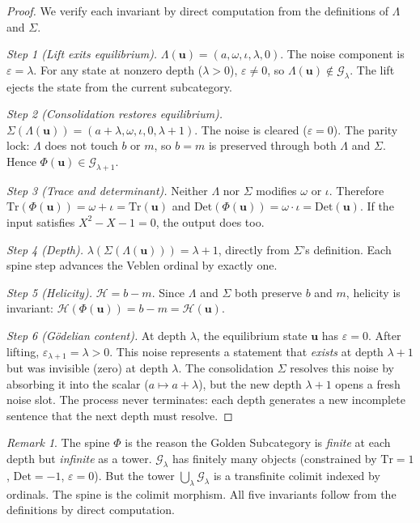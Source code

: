 \documentclass[12pt,oneside]{article}
\theoremstyle{principia}
\theoremstyle{definition}
\theoremstyle{remark}
\newtheorem{remark}[theorem]{Remark}
\providecommand{\GG}{\mathcal{G}}
\providecommand{\eps}{\varepsilon}
\providecommand{\lam}{\lambda}
\begin{document}
\begin{proof}
We verify each invariant by direct computation from the definitions of $\Lambda$ and $\Sigma$.

\emph{Step 1 (Lift exits equilibrium).} $\Lambda(\mathbf{u}) = (a, \omega, \iota, \lam, 0)$. The noise component is $\eps = \lam$. For any state at nonzero depth ($\lam > 0$), $\eps \neq 0$, so $\Lambda(\mathbf{u}) \notin \GG_\lam$. The lift ejects the state from the current subcategory.

\emph{Step 2 (Consolidation restores equilibrium).} $\Sigma(\Lambda(\mathbf{u})) = (a + \lam, \omega, \iota, 0, \lam + 1)$. The noise is cleared ($\eps = 0$). The parity lock: $\Lambda$ does not touch $b$ or $m$, so $b = m$ is preserved through both $\Lambda$ and $\Sigma$. Hence $\Phi(\mathbf{u}) \in \GG_{\lam+1}$.

\emph{Step 3 (Trace and determinant).} Neither $\Lambda$ nor $\Sigma$ modifies $\omega$ or $\iota$. Therefore $\mathrm{Tr}(\Phi(\mathbf{u})) = \omega + \iota = \mathrm{Tr}(\mathbf{u})$ and $\mathrm{Det}(\Phi(\mathbf{u})) = \omega \cdot \iota = \mathrm{Det}(\mathbf{u})$. If the input satisfies $X^2 - X - 1 = 0$, the output does too.

\emph{Step 4 (Depth).} $\lam(\Sigma(\Lambda(\mathbf{u}))) = \lam + 1$, directly from $\Sigma$'s definition. Each spine step advances the Veblen ordinal by exactly one.

\emph{Step 5 (Helicity).} $\mathcal{H} = b - m$. Since $\Lambda$ and $\Sigma$ both preserve $b$ and $m$, helicity is invariant: $\mathcal{H}(\Phi(\mathbf{u})) = b - m = \mathcal{H}(\mathbf{u})$.

\emph{Step 6 (G\"odelian content).} At depth $\lam$, the equilibrium state $\mathbf{u}$ has $\eps = 0$. After lifting, $\eps_{\lam+1} = \lam > 0$. This noise represents a statement that \emph{exists} at depth $\lam + 1$ but was invisible (zero) at depth $\lam$. The consolidation $\Sigma$ resolves this noise by absorbing it into the scalar ($a \mapsto a + \lam$), but the new depth $\lam + 1$ opens a fresh noise slot. The process never terminates: each depth generates a new incomplete sentence that the next depth must resolve. \qedhere
\end{proof}

\begin{remark}
The spine $\Phi$ is the reason the Golden Subcategory is \emph{finite} at each depth but \emph{infinite} as a tower. $\GG_\lam$ has finitely many objects (constrained by $\mathrm{Tr} = 1$, $\mathrm{Det} = -1$, $\eps = 0$). But the tower $\bigcup_\lam \GG_\lam$ is a transfinite colimit indexed by ordinals. The spine is the colimit morphism. All five invariants follow from the definitions by direct computation.
\end{remark}
\end{document}
